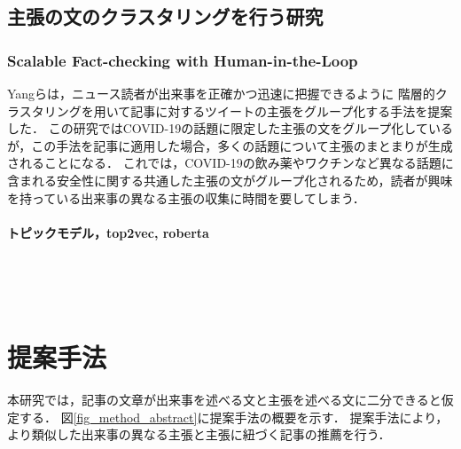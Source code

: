 \documentclass[12pt,a4j]{jreport}
\begin{document}
\section{主張の文のクラスタリングを行う研究}

\subsection{Scalable Fact-checking with Human-in-the-Loop}

Yangらは，ニュース読者が出来事を正確かつ迅速に把握できるように
階層的クラスタリングを用いて記事に対するツイートの主張をグループ化する手法を提案した\cite{yang_scalable_2021}．
この研究ではCOVID-19の話題に限定した主張の文をグループ化しているが，この手法を記事に適用した場合，多くの話題について主張のまとまりが生成されることになる．
これでは，COVID-19の飲み薬やワクチンなど異なる話題に含まれる安全性に関する共通した主張の文がグループ化されるため，読者が興味を持っている出来事の異なる主張の収集に時間を要してしまう．



\subsubsection{トピックモデル，top2vec, roberta}
~

~


\chapter{提案手法}
\label{chapter_method}

本研究では，記事の文章が出来事を述べる文と主張を述べる文に二分できると仮定する．
図\ref{fig_method_abstract}に提案手法の概要を示す．
提案手法により，より類似した出来事の異なる主張と主張に紐づく記事の推薦を行う．
\end{document}
